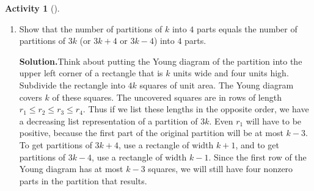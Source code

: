 \documentclass[10pt,]{book}
\theoremstyle{plain}
\theoremstyle{definition}
\newtheorem{activity}[project]{Activity}
\numberwithin{equation}{chapter}
\begin{document}
\begin{activity}[]\label{rectanglecomplement}
~\par
\begin{enumerate}[label=(\alph*)]
 \item Show that the number of partitions of \(k\) into \(4\) parts equals the number of partitions of \(3k\) (or \(3k+4\) or \(3k-4\)) into \(4\) parts.%
\par\medskip\noindent%
\textbf{Solution.}\quad Think about putting the Young diagram of the partition into the upper left corner of a rectangle that is \(k\) units wide and four units high. Subdivide the rectangle into \(4k\) squares of unit area. The Young diagram covers \(k\) of these squares. The uncovered squares are in rows of length \(r_1\le r_2\le r_3\le r_4\). Thus if we list these lengths in the opposite order, we have a decreasing list representation of a partition of \(3k\). Even \(r_1\) will have to be positive, because the first part of the original partition will be at most \(k-3\). To get partitions of \(3k+4\), use a rectangle of width \(k+1\), and to get partitions of \(3k-4\), use a rectangle of width \(k-1\). Since the first row of the Young diagram has at most \(k-3\) squares, we will still have four nonzero parts in the partition that results.%


\end{enumerate}
\end{activity}
\end{document}
